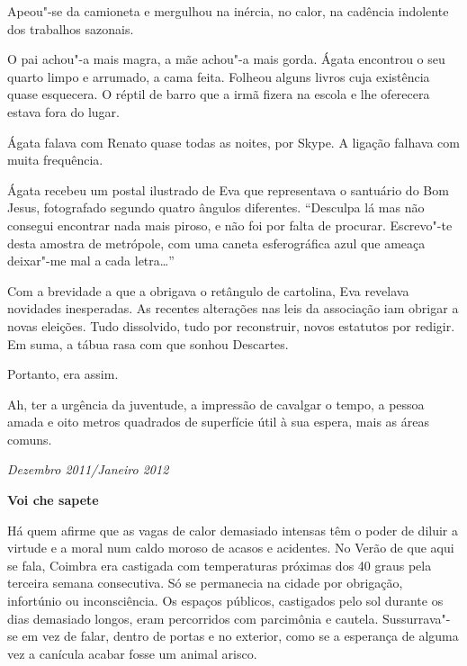 Apeou"-se da camioneta e mergulhou na inércia, no calor,
na cadência indolente dos trabalhos sazonais.

O pai achou"-a mais magra, a mãe achou"-a mais gorda. Ágata encontrou o
seu quarto limpo e arrumado, a cama feita. Folheou alguns livros cuja
existência quase esquecera. O réptil de barro que a irmã fizera na
escola e lhe oferecera estava fora do lugar.

Ágata falava com Renato quase todas as noites, por Skype.
A ligação falhava com muita frequência.

Ágata recebeu um postal ilustrado de Eva que representava o santuário
do Bom Jesus, fotografado segundo quatro ângulos diferentes. ``Desculpa
lá mas não consegui encontrar nada mais piroso, e não foi por falta de
procurar. Escrevo"-te desta amostra de metrópole, com uma caneta esferográfica azul que
ameaça deixar"-me mal a cada letra\ldots{}''

Com a brevidade a que a obrigava o retângulo de cartolina, Eva
revelava novidades inesperadas. As recentes alterações nas leis da
associação iam obrigar a novas eleições. Tudo dissolvido, tudo por
reconstruir, novos estatutos por redigir. Em suma, a tábua rasa com que
sonhou Descartes.

Portanto, era assim.

Ah, ter a urgência da juventude, a impressão de cavalgar o tempo, a
pessoa amada e oito metros quadrados de superfície útil à sua espera,
mais as áreas comuns.

\begin{flushright}
\emph{Dezembro 2011/Janeiro 2012}
\end{flushright}
\pagebreak
\thispagestyle{empty}

\movetooddpage\vspace*{1.8cm}
\noindent{}\textbf{Voi che sapete}
\bigskip

Há quem afirme que as vagas de calor demasiado intensas têm o poder de
diluir a virtude e a moral num caldo moroso de acasos e acidentes. No
Verão de que aqui se fala, Coimbra era castigada com temperaturas
próximas dos 40 graus pela terceira semana consecutiva. Só se permanecia
na cidade por obrigação, infortúnio ou inconsciência. Os espaços
públicos, castigados pelo sol durante os dias demasiado longos, eram
percorridos com parcimônia e cautela. Sussurrava"-se em vez de falar,
dentro de portas e no exterior, como se a esperança de alguma vez a
canícula acabar fosse um animal arisco.

